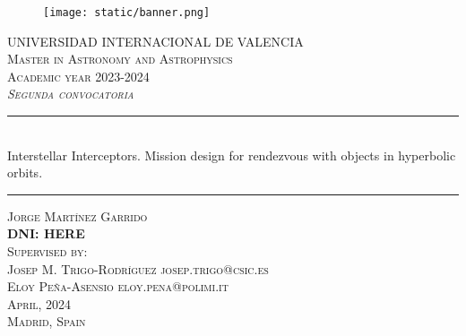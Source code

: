 \begin{titlepage}

  \begin{center}

    \begin{figure}[h]
      \centering
      \texttt{[image: static/banner.png]}
    \end{figure}
    \vspace{1cm}

    \textsc{\large
      UNIVERSIDAD INTERNACIONAL DE VALENCIA
    }\\[0.25cm]
    \textsc{\large
      Master in Astronomy and Astrophysics \\
      Academic year 2023-2024
    }\\[1cm]
    \textsc{\large
    \textit{Segunda convocatoria}
    }\\[1.25cm]

    \noindent\rule{\textwidth}{1pt}
    \\[0.25cm]
    {
    \fontsize{35pt}{35pt}\selectfont
    {
      Interstellar Interceptors. Mission design for rendezvous with objects in hyperbolic orbits.
    }
    }
    \noindent\rule{\textwidth}{1pt}

    \vspace{1.5cm}
    \textsc{\Large
      Jorge Martínez Garrido \\
      \textbf{DNI: HERE}
    }\\[1.25cm]
    \textsc{\large
      Supervised by:
    }\\[0.25cm]
    \textsc{\large
     Josep M. Trigo-Rodríguez josep.trigo@csic.es \\
     Eloy Peña-Asensio eloy.pena@polimi.it
    }\\[1.5cm]

    \textsc{\large
       April, 2024
    }\\[0.25cm]
    \textsc{\large
       Madrid, Spain
    }\\[0.25cm]

  \end{center}
\end{titlepage}
